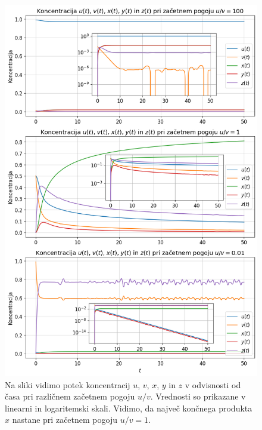 \documentclass[slovene,11pt,a4paper]{article}
\begin{document}
\newpage

\begin{figure}[h!]
\centering
\includegraphics[width=15cm]{bromid1.png}
\caption{Na sliki vidimo potek koncentracij $u$, $v$, $x$, $y$ in $z$ v odvisnosti od časa pri različnem začetnem pogoju $u/v$. Vrednosti so prikazane v linearni in logaritemski skali. Vidimo, da največ končnega produkta $x$ nastane pri začetnem pogoju $u/v = 1$.}
\end{figure}

\newpage
\end{document}
